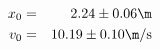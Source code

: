 \begin{eqnarray*}
x_0 & = & 2.24 \pm 0.06 \m\\
v_0 & = & 10.19 \pm 0.10 \m/{\rm s}\\
\end{eqnarray*}
